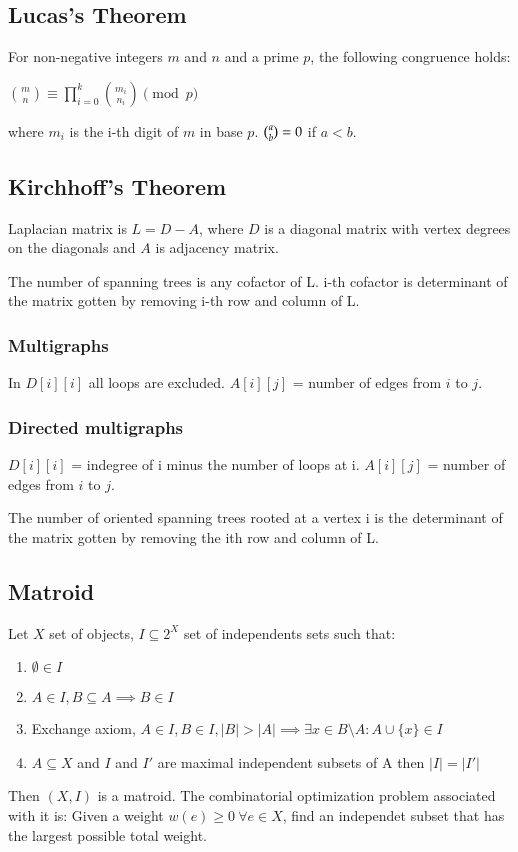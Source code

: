 \documentclass[letterpaper,10pt,oneside,footsepline, landscape]{article}
\begin{document}
\begin{multicols}{3}
\subsection{Lucas's Theorem}
For non-negative integers $m$ and $n$ and a prime $p$, the following congruence holds:

$\displaystyle \binom{m}{n} \equiv \prod_{i = 0}^{k} \binom{m_i}{n_i} \pmod p$

where $m_i$ is the i-th digit of $m$ in base $p$. ${\displaystyle {\tbinom {a}{b}}=0}$ if $a < b$.

\subsection{Kirchhoff's Theorem}
Laplacian matrix is $L = D - A$, where $D$ is a diagonal matrix with vertex degrees on the diagonals and $A$ is adjacency matrix.

The number of spanning trees is any cofactor of L. i-th cofactor is determinant of the matrix gotten by removing i-th row and column of L.

\subsubsection{Multigraphs}
In $D[i][i]$ all loops are excluded. $A[i][j]$ = number of edges from $i$ to $j$.

\subsubsection{Directed multigraphs}
$D[i][i]$ = indegree of i minus the number of loops at i. $A[i][j]$ = number of edges from $i$ to $j$.

The number of oriented spanning trees rooted at a vertex i is the determinant of the matrix gotten by removing the ith row and column of L.

\subsection{Matroid}
Let $X$ set of objects, $I \subseteq 2^X$ set of independents sets such that:
\begin{enumerate}
\item $\emptyset \in I$
\item $A \in I, B \subseteq A \implies B \in I$
\item Exchange axiom, $A \in I, B \in I, |B| > |A| \implies \exists x \in B \setminus A : A \cup \{x\} \in I$
\item $A \subseteq X$ and $I$ and $I'$ are maximal independent subsets of A then $|I| = |I'|$
\end{enumerate}
Then $(X, I)$ is a matroid. The combinatorial optimization problem associated with it is: Given a weight $w(e) \geq 0 ~\forall e \in X$, find an independet subset that has the largest possible total weight. \\


\end{multicols}
\end{document}
